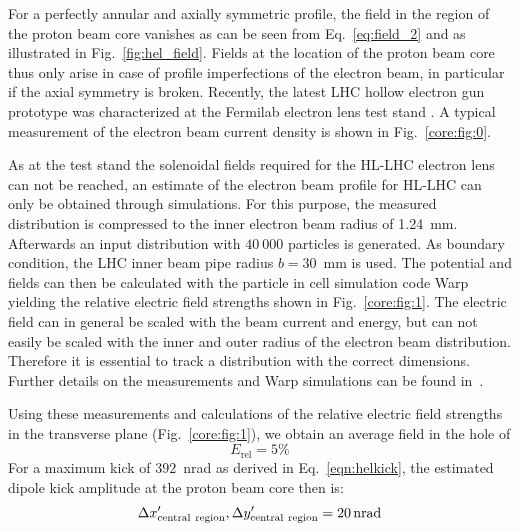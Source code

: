 \documentclass[%
 reprint,
 amsmath,amssymb,
 aps,
prstab,
]{revtex4-1}
\begin{document}
For a perfectly annular and axially symmetric profile, the field in
the region of the proton beam core vanishes as can be seen from
Eq.~\ref{eq:field_2} and as illustrated in
Fig.~\ref{fig:hel_field}. Fields at the location of the proton beam
core thus only arise in case of profile imperfections of the electron
beam, in particular if the axial symmetry is broken. Recently, the
latest LHC hollow electron gun prototype was characterized at the
Fermilab electron lens test stand \cite{hel_test_stand_fnal}. A
typical measurement of the electron beam current density is shown in
Fig.~\ref{core:fig:0}.

As at the test stand the solenoidal fields required for the HL-LHC
electron lens can not be reached, an estimate of the electron beam
profile for HL-LHC can only be obtained through simulations. For this
purpose, the measured distribution is compressed to the inner electron
beam radius of 1.24~mm. Afterwards an input distribution with
$40\ 000$ particles is generated. As boundary condition, the LHC inner
beam pipe radius $b=30$~mm is used. The potential and fields can then
be calculated with the particle in cell simulation code
Warp~\cite{warp} yielding the relative electric field strengths shown
in Fig.~\ref{core:fig:1}. The electric field can in general be scaled
with the beam current and energy, but can not easily be scaled with
the inner and outer radius of the electron beam
distribution. Therefore it is essential to track a distribution with
the correct dimensions. Further details on the measurements and Warp
simulations can be found in~\cite{hel_res_field_stancari_2017}.

Using these measurements and calculations of the relative electric field strengths in the transverse plane (Fig.~\ref{core:fig:1}), we obtain an average field in the hole of
\begin{equation}
	E_{\mathrm{rel}}= 5\%
\end{equation}
For a maximum kick of $392$~nrad as derived in Eq.~\ref{eqn:helkick}, the estimated dipole kick amplitude at the proton beam core then is:
\begin{equation}\label{eqn:kick_central}
\Delta x'_{\rm{central \ region}}, \Delta y'_{\rm{central \ region}} = \SI{20}{nrad}
\end{equation}
\end{document}
